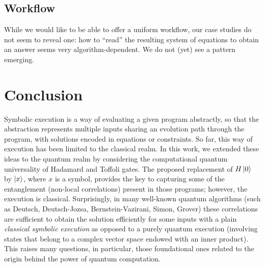 \documentclass[sigplan,screen]{acmart}
\theoremstyle{definition}
\begin{document}
\subsection{Workflow}

While we would like to be able to offer a uniform workflow, our case
studies do not seem to reveal one: how to ``read'' the resulting
system of equations to obtain an answer seems very algorithm-dependent.
We do not (yet) see a pattern emerging.

\section{Conclusion}
\label{sec6}

Symbolic execution is a way of evaluating a given program abstractly,
so that the abstraction represents multiple inputs sharing an
evolution path through the program, with solutions encoded in
equations or constraints. So far, this way of execution has been
limited to the classical realm. In this work, we extended these ideas
to the quantum realm by considering the computational quantum
universality of Hadamard and Toffoli gates. The proposed replacement
of $H \ket{0}$ by $\ket{x}$, where $x$ is a symbol, provides the key
to capturing some of the entanglement (non-local correlations) present
in those programs; however, the execution is classical. Surprisingly,
in many well-known quantum algorithms (such as Deutsch, Deutsch-Jozsa,
Bernstein-Vazirani, Simon, Grover) these correlations are sufficient
to obtain the solution efficiently for some inputs with a plain
\emph{classical symbolic execution} as opposed to a purely quantum
execution (involving states that belong to a complex vector space
endowed with an inner product). This raises many questions, in
particular, those foundational ones related to the origin behind the
power of quantum computation.



\end{document}
